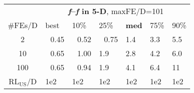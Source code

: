 \begin{tabular}{c|llllll}
 & \multicolumn{6}{|c}{\textbf{\textit{f}\raisebox{-0.35ex}{1}--\textit{f}\raisebox{-0.35ex}{24} in 5-D}, maxFE/D=101}\\
\#FEs/D & best & 10\% & 25\% & \textbf{med} & 75\% & 90\%\\
2 & ~\,0.45 & ~\,0.52 & ~\,0.75 & \hspace*{1ex}1.4 & \hspace*{1ex}3.3 & \hspace*{1ex}5.5\\
10 & ~\,0.65 & ~\,1.00 & \hspace*{1ex}1.9 & \hspace*{1ex}2.8 & \hspace*{1ex}4.2 & \hspace*{1ex}6.0\\
100 & ~\,0.65 & ~\,0.94 & \hspace*{1ex}1.9 & \hspace*{1ex}4.1 & \hspace*{1ex}6.4 & 11\\
$\text{RL}_{\text{US}}$/D & 1e2 & 1e2 & 1e2 & 1e2 & 1e2 & 1e2
\end{tabular}
